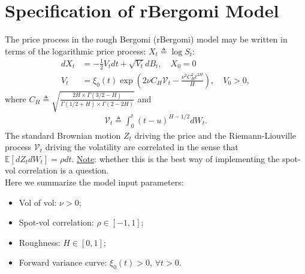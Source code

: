 \documentclass[12pt]{article}
\numberwithin{equation}{section}
\begin{document}
\section{Specification of rBergomi Model}
\label{rbergomitree}
The price process in the rough Bergomi (rBergomi) model may be written in terms of the logarithmic price process: $X_t \triangleq \log S_t$: 
\begin{align}
\label{spec21} dX_t &= -\frac{1}{2}V_t dt + \sqrt{V_t}dB_t, \quad X_0 = 0\\
\label{spec22} V_t &= \xi_0(t)\exp\left( 2\nu C_H \mathcal{V}_t - \frac{\nu^2 C_H^2 t^{2H}}{H} \right), \quad V_0 > 0,
\end{align}
where $C_H \triangleq \sqrt{\frac{2H\times\Gamma(3/2-H)}{\Gamma(1/2+H)\times\Gamma(2-2H)}}$ and
\begin{align}
\label{spec12}
\mathcal{V}_t \triangleq \int_0^t (t-u)^{H-1/2} dW_t.
\end{align}
The standard Brownian motion $Z_t$ driving the price and the 
Riemann-Liouville process $\mathcal{V}_t$ driving the volatility are correlated in the sense that $\mathbb{E}[dZ_t dW_t] = \rho dt$. \underline{Note}: whether this is the best way of implementing the spot-vol correlation is a question.\\
\newline
Here we summarize the model input parameters:
\begin{itemize}[noitemsep]
\item Vol of vol: $\nu>0$;
\item Spot-vol correlation: $\rho \in [-1,1]$;
\item Roughness: $H \in [0,1]$;
\item Forward variance curve: $\xi_0(t)>0$, $\forall t>0$.
\end{itemize}
\end{document}
